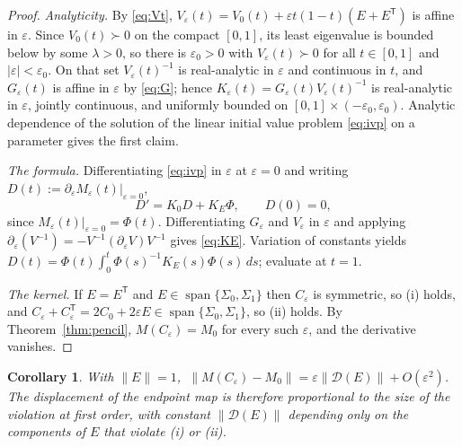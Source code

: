 \documentclass[11pt]{article}
\newtheorem{corollary}[lemma]{Corollary}
\theoremstyle{definition}
\theoremstyle{remark}
\DeclareMathOperator{\spn}{span}
\newcommand{\T}{\mathsf{T}}
\begin{document}
\begin{proof}
\emph{Analyticity.} By \eqref{eq:Vt}, $V_\varepsilon(t)=V_0(t)+\varepsilon t(1-t)(E+E^{\T})$ is
affine in $\varepsilon$. Since $V_0(t)\succ0$ on the compact $[0,1]$, its least eigenvalue is
bounded below by some $\lambda>0$, so there is $\varepsilon_0>0$ with $V_\varepsilon(t)\succ0$ for
all $t\in[0,1]$ and $|\varepsilon|<\varepsilon_0$. On that set $V_\varepsilon(t)^{-1}$ is
real-analytic in $\varepsilon$ and continuous in $t$, and $G_\varepsilon(t)$ is affine in
$\varepsilon$ by \eqref{eq:G}; hence $K_\varepsilon(t)=G_\varepsilon(t)V_\varepsilon(t)^{-1}$ is
real-analytic in $\varepsilon$, jointly continuous, and uniformly bounded on
$[0,1]\times(-\varepsilon_0,\varepsilon_0)$. Analytic dependence of the solution of the linear
initial value problem \eqref{eq:ivp} on a parameter gives the first claim.

\emph{The formula.} Differentiating \eqref{eq:ivp} in $\varepsilon$ at $\varepsilon=0$ and writing
$D(t):=\partial_\varepsilon M_\varepsilon(t)|_{\varepsilon=0}$,
\[
D'=K_0D+K_E\Phi,\qquad D(0)=0,
\]
since $M_\varepsilon(t)|_{\varepsilon=0}=\Phi(t)$. Differentiating $G_\varepsilon$ and
$V_\varepsilon$ in $\varepsilon$ and applying $\partial_\varepsilon(V^{-1})=-V^{-1}(\partial_\varepsilon V)V^{-1}$
gives \eqref{eq:KE}. Variation of constants yields
$D(t)=\Phi(t)\int_0^t\Phi(s)^{-1}K_E(s)\Phi(s)\,ds$; evaluate at $t=1$.

\emph{The kernel.} If $E=E^{\T}$ and $E\in\spn\{\Sigma_0,\Sigma_1\}$ then $C_\varepsilon$ is
symmetric, so (i) holds, and $C_\varepsilon+C_\varepsilon^{\T}=2C_0+2\varepsilon E\in
\spn\{\Sigma_0,\Sigma_1\}$, so (ii) holds. By Theorem~\ref{thm:pencil}, $M(C_\varepsilon)=M_0$ for
every such $\varepsilon$, and the derivative vanishes.
\end{proof}

\begin{corollary}\label{cor:stab}
With $\|E\|=1$, $\ \|M(C_\varepsilon)-M_0\|=\varepsilon\|\mathcal D(E)\|+O(\varepsilon^{2})$. The
displacement of the endpoint map is therefore proportional to the size of the violation at first
order, with constant $\|\mathcal D(E)\|$ depending only on the components of $E$ that violate
\textup{(i)} or \textup{(ii)}.
\end{corollary}
\end{document}
